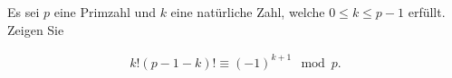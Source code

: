 
\begin{exercise}

Es sei $p$ eine Primzahl und $k$ eine natürliche Zahl, welche $0 \leq k \leq p - 1$ erfüllt.
Zeigen Sie

\begin{align*}
    k!(p-1-k)! \equiv (-1)^{k+1} \mod{p}.
\end{align*}

\end{exercise}


\begin{solution}

\phantom{}

\end{solution}

